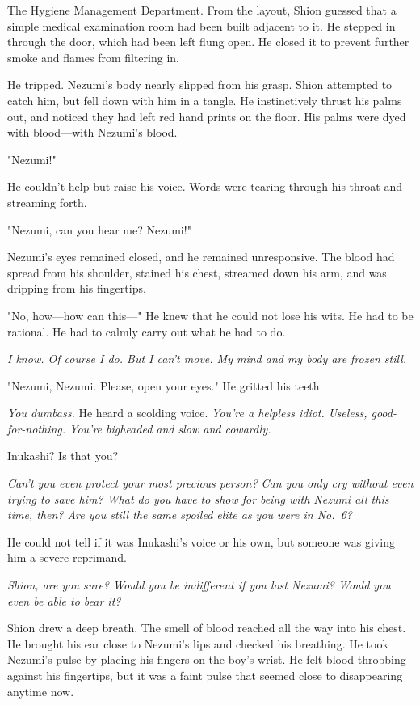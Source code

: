 The Hygiene Management Department. From the layout, Shion guessed that a
simple medical examination room had been built adjacent to it. He
stepped in through the door, which had been left flung open. He closed
it to prevent further smoke and flames from filtering in.

He tripped. Nezumi's body nearly slipped from his grasp. Shion attempted
to catch him, but fell down with him in a tangle. He instinctively
thrust his palms out, and noticed they had left red hand prints on the
floor. His palms were dyed with blood---with Nezumi's blood.

"Nezumi!"

He couldn't help but raise his voice. Words were tearing through his
throat and streaming forth.

"Nezumi, can you hear me? Nezumi!"

Nezumi's eyes remained closed, and he remained unresponsive. The blood
had spread from his shoulder, stained his chest, streamed down his arm,
and was dripping from his fingertips.

"No, how---how can this---" He knew that he could not lose his wits. He had
to be rational. He had to calmly carry out what he had to do.

\emph{I know. Of course I do. But I can't move. My mind and my body are frozen
still.}

"Nezumi, Nezumi. Please, open your eyes." He gritted his teeth.

\emph{You dumbass.} He heard a scolding voice. \emph{You're a helpless idiot.
Useless, good-for-nothing. You're bigheaded and slow and cowardly.}

Inukashi? Is that you?

\emph{Can't you even protect your most precious person? Can you only cry
without even trying to save him? What do you have to show for being with
Nezumi all this time, then? Are you still the same spoiled elite as you
were in No.~6?}

He could not tell if it was Inukashi's voice or his own, but someone was
giving him a severe reprimand.

\emph{Shion, are you sure? Would you be indifferent if you lost Nezumi? Would
you even be able to bear it?}

Shion drew a deep breath. The smell of blood reached all the way into
his chest. He brought his ear close to Nezumi's lips and checked his
breathing. He took Nezumi's pulse by placing his fingers on the boy's
wrist. He felt blood throbbing against his fingertips, but it was a
faint pulse that seemed close to disappearing anytime now.

